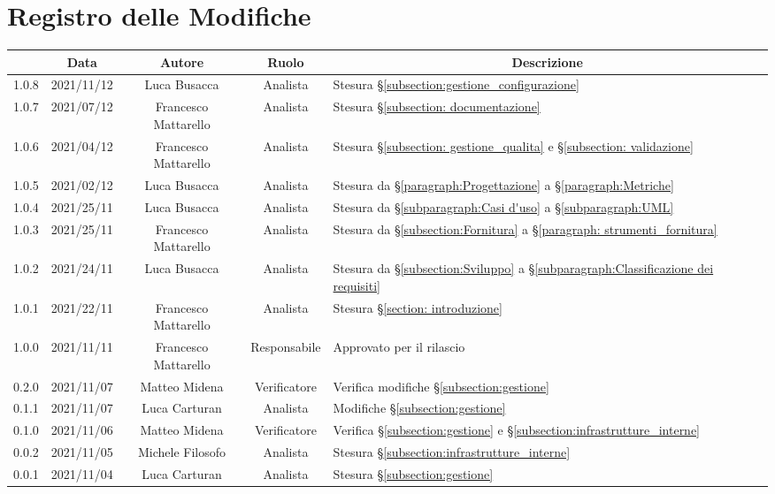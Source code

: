 \thispagestyle{empty}
\section*{Registro delle Modifiche}

\begin{center}
	\renewcommand{\arraystretch}{1.8}
	\begin{longtable}[c]{c | c | c | c | p{5cm}}
		\rowcolor[HTML]{125E28}
		\multicolumn{1}{c}{\color[HTML]{FFFFFF} \textbf{Versione}} & 
		\multicolumn{1}{c}{\color[HTML]{FFFFFF} \textbf{Data}} & 
		\multicolumn{1}{c}{\color[HTML]{FFFFFF} \textbf{Autore}} & 
		\multicolumn{1}{c}{\color[HTML]{FFFFFF} \textbf{Ruolo}} & 
		\multicolumn{1}{c}{\color[HTML]{FFFFFF} \textbf{Descrizione}} \\
		\endhead
		1.0.8 & 2021/11/12 & Luca Busacca & Analista & Stesura  §\ref{subsection:gestione_configurazione} \\
		1.0.7 & 2021/07/12 & Francesco Mattarello & Analista & Stesura §\ref{subsection: documentazione}\\
		1.0.6 & 2021/04/12 & Francesco Mattarello & Analista & Stesura §\ref{subsection: gestione_qualita} e §\ref{subsection: validazione}\\
		1.0.5 & 2021/02/12 & Luca Busacca & Analista & Stesura da  §\ref{paragraph:Progettazione} a §\ref{paragraph:Metriche} \\
		1.0.4 & 2021/25/11 & Luca Busacca & Analista & Stesura da  §\ref{subparagraph:Casi d'uso} a §\ref{subparagraph:UML} \\
		1.0.3 & 2021/25/11 & Francesco Mattarello & Analista & Stesura da §\ref{subsection:Fornitura} a §\ref{paragraph: strumenti_fornitura} \\
		1.0.2 & 2021/24/11 & Luca Busacca & Analista & Stesura da §\ref{subsection:Sviluppo} a  §\ref{subparagraph:Classificazione dei requisiti} \\
		1.0.1 & 2021/22/11 & Francesco Mattarello & Analista & Stesura §\ref{section: introduzione}\\
		1.0.0 & 2021/11/11 & Francesco Mattarello & Responsabile & Approvato per il rilascio\\
		0.2.0 & 2021/11/07 & Matteo Midena & Verificatore & Verifica modifiche §\ref{subsection:gestione}\\
		0.1.1 & 2021/11/07 & Luca Carturan & Analista & Modifiche §\ref{subsection:gestione}\\
		0.1.0 & 2021/11/06 & Matteo Midena & Verificatore & Verifica  §\ref{subsection:gestione} e  §\ref{subsection:infrastrutture_interne}\\
		0.0.2 & 2021/11/05 & Michele Filosofo & Analista & Stesura §\ref{subsection:infrastrutture_interne}\\
		0.0.1 & 2021/11/04 & Luca Carturan & Analista &Stesura §\ref{subsection:gestione}  \\

	\end{longtable}
\end{center}